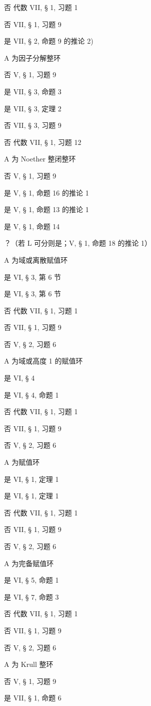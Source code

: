 否 代数 VII, § 1, 习题 1

否 VII, § 1, 习题 9

是 VII, § 2, 命题 9 的推论 2)

A 为因子分解整环

否 V, § 1, 习题 9

是 VII, § 3, 命题 3

是 VII, § 3, 定理 2

否 VII, § 3, 习题 9

否 代数 VII, § 1, 习题 12

A 为 Noether 整闭整环

否 V, § 1, 习题 9

是 V, § 1, 命题 16 的推论 1

是 V, § 1, 命题 13 的推论 1

是 V, § 1, 命题 14

？（若 L 可分则是；V, § 1, 命题 18 的推论 1）

A 为域或离散赋值环

是 VI, § 3, 第 6 节

是 VI, § 3, 第 6 节

否 代数 VII, § 1, 习题 1

否 VII, § 1, 习题 9

否 V, § 2, 习题 6

A 为域或高度 1 的赋值环

是 VI, § 4

是 VI, § 4, 命题 1

否 代数 VII, § 1, 习题 1

否 VII, § 1, 习题 9

否 V, § 2, 习题 6

A 为赋值环

是 VI, § 1, 定理 1

是 VI, § 1, 定理 1

否 代数 VII, § 1, 习题 1

否 VII, § 1, 习题 9

否 V, § 2, 习题 6

A 为完备赋值环

是 VI, § 5, 命题 1

是 VI, § 7, 命题 3

否 代数 VII, § 1, 习题 1

否 VII, § 1, 习题 9

否 V, § 2, 习题 6

A 为 Krull 整环

否 V, § 1, 习题 9

是 VII, § 1, 命题 6

